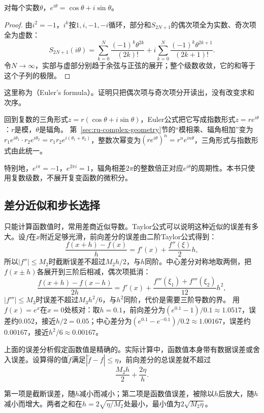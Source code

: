 \begin{theorem}[Euler公式]
\label{thm:ru-euler-formula}
对每个实数$\theta$，$e^{i\theta}=\cos\theta+i\sin\theta$。
\end{theorem}
\begin{proof}
由$i^2=-1$，$i^k$按$1,i,-1,-i$循环，部分和$S_{2N+1}$的偶次项全为实数、奇次项全为虚数：
\[
 S_{2N+1}(i\theta)=\sum_{k=0}^N\frac{(-1)^k\theta^{2k}}{(2k)!}+i\sum_{k=0}^N\frac{(-1)^k\theta^{2k+1}}{(2k+1)!}.
\]
令$N\to\infty$，实部与虚部分别趋于余弦与正弦的展开；整个级数收敛，它的和等于这个子列的极限。
\end{proof}
这里称为（Euler's formula）。证明只把偶次项与奇次项分开读出，没有改变求和次序。

回到复数的三角形式$z=r(\cos\theta+i\sin\theta)$，Euler公式把它写成指数形式$z=re^{i\theta}$：$r$是模，$\theta$是辐角。
第~\ref{sec:ru-complex-geometry}节的“模相乘、辐角相加”变为$r_1e^{i\theta_1}\cdot r_2e^{i\theta_2}=r_1r_2e^{i(\theta_1+\theta_2)}$，整数次幂变为$(re^{i\theta})^n=r^ne^{in\theta}$，三角形式与指数形式由此统一。

特别地，$e^{i\pi}=-1$，$e^{2\pi i}=1$，辐角相差$2\pi$的整数倍正对应$e^{i\theta}$的周期性。本书只使用复数级数，不展开复变函数的微积分。

\subsection{差分近似和步长选择}
\label{sec:ru-finite-differences}

只能计算函数值时，常用差商近似导数。Taylor公式可以说明这种近似的误差有多大。设$f$在$x$附近足够光滑，前向差分的误差由二阶Taylor公式得到：
\[
 \frac{f(x+h)-f(x)}h=f'(x)+\frac{f''(\xi)}2h,
\]
所以$|f''|\leq M_2$时截断误差不超过$M_2h/2$，与$h$同阶。中心差分对称地取两侧，把$f(x\pm h)$各展开到三阶后相减，偶次项抵消：
\[
 \frac{f(x+h)-f(x-h)}{2h}=f'(x)+\frac{f'''(\xi_1)+f'''(\xi_2)}{12}h^2,
\]
$|f'''|\leq M_3$时误差不超过$M_3h^2/6$，与$h^2$同阶，代价是需要三阶导数的界。
用$f(x)=e^x$在$x=0$处核对：取$h=0.1$，前向差分为$(e^{0.1}-1)/0.1\approx1.0517$，误差约$0.052$，接近$h/2=0.05$；中心差分为$(e^{0.1}-e^{-0.1})/0.2\approx1.00167$，误差约$0.00167$，接近$h^2/6\approx0.00167$。

上面的误差分析假定函数值是精确的。实际计算中，函数值本身带有数据误差或舍入误差。设算得的值$\tilde f$满足$|\tilde f-f|\leq\eta$，前向差分的总误差就不超过
\[
 \frac{M_2h}2+\frac{2\eta}h.
\]

第一项是截断误差，随$h$减小而减小；第二项是函数值误差，被除以$h$后放大，随$h$减小而增大。两者之和在$h=2\sqrt{\eta/M_2}$处最小，最小值为$2\sqrt{M_2\eta}$。

